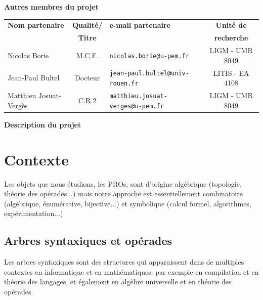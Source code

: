 \documentclass[10pt,reqno]{amsart}
\numberwithin{equation}{subsection}
\begin{document}
\Large{\bf{Autres membres du projet}}

\begin{center}
\begin{small}
\begin{tabular}{|l|c|l|c|}\hline
    \bf{Nom partenaire} & \bf{Qualité/} & \bf{e-mail partenaire}
        & \bf{Unité de} \\
    & \bf{Titre} &  & \bf{recherche} \\ \hline
    Nicolas Borie & M.C.F. & {\tt nicolas.borie@u-pem.fr}
        & LIGM - UMR 8049 \\ \hline
    Jean-Paul Bultel & Docteur & {\tt jean-paul.bultel@univ-rouen.fr}
        & LITIS - EA 4108 \\ \hline
  Matthieu Josuat-Vergès \qquad & C.R.2 & {\tt matthieu.josuat-verges@u-pem.fr}
   \qquad
    & LIGM - UMR 8049 \qquad \\ \hline
\end{tabular}
\end{small}
\end{center}
\bigskip

\Large{\bf{Description du projet}}

\section{Contexte}


Les objets que nous étudions, les PROs, sont d'origine algébrique (topologie, théorie
des opérades...) mais notre approche est essentiellement combinatoire 
(algébrique, énumérative, bijective...) et symbolique (calcul formel, algorithmes, expérimentation...)  


\subsection{Arbres syntaxiques et opérades}
Les arbres syntaxiques sont des structures qui apparaissent 
dans de multiples contextes en informatique et en mathématiques: 
par exemple en compilation et en théorie des langages, et également en 
algèbre universelle et en théorie des opérades.
\end{document}
